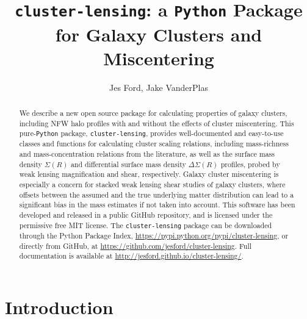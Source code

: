 \documentclass[twocolumn]{aastex6}
\newcommand{\code}{\lstinline[style=codeintext]}
\newcommand{\hcode}{\large\normalfont\texttt} %
\begin{document}
\title{\MakeLowercase{\hcode{cluster-lensing}}: a \hcode{P}\MakeLowercase{\hcode{ython}} Package for Galaxy Clusters and Miscentering}

\author{
Jes Ford,
Jake VanderPlas
}

\shorttitle{\hcode{cluster-lensing}}


\begin{abstract}
We describe a new open source package for calculating properties of galaxy clusters, including NFW halo profiles with and without the effects of cluster miscentering. This pure-\code{Python} package, \code{cluster-lensing}, provides well-documented and easy-to-use classes and functions for calculating cluster scaling relations, including mass-richness and mass-concentration relations from the literature, as well as the surface mass density $\Sigma(R)$ and differential surface mass density $\Delta\Sigma(R)$ profiles, probed by weak lensing magnification and shear, respectively. Galaxy cluster miscentering is especially a concern for stacked weak lensing shear studies of galaxy clusters, where offsets between the assumed and the true underlying matter distribution can lead to a significant bias in the mass estimates if not taken into account. This software has been developed and released in a public GitHub repository, and is licensed under the permissive free MIT license. The \code{cluster-lensing} package can be downloaded through the Python Package Index, \url{https://pypi.python.org/pypi/cluster-lensing}, or directly from GitHub, at \url{https://github.com/jesford/cluster-lensing}. Full documentation is available at \url{http://jesford.github.io/cluster-lensing/}.
\end{abstract}


\setcounter{section}{0}
\setcounter{subsection}{0}
\setcounter{subsubsection}{0}


\section{Introduction}
\label{intro}
\end{document}
